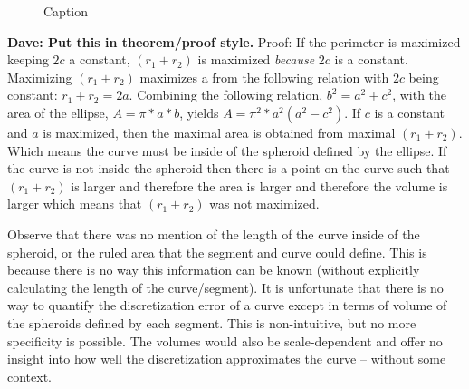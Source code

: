 \begin{figure}[h!]
  \caption{\label{EllipseGeometry} Caption}
\end{figure}

{\bf{Dave:  Put this in theorem/proof style.}}
Proof: If the perimeter is maximized keeping $2c$ a constant, $(r_1 + r_2)$ is maximized \textit{because} $2c$ is a constant.  Maximizing $(r_1+r_2)$ maximizes a from the following relation with $2c$ being constant: $r_1 + r_2 = 2a$.  Combining the following relation, $b^2 = a^2 + c^2$, with the area of the ellipse, $A = \pi * a * b$, yields $A=\pi^{2}*a^{2}(a^{2} - c^2)$.  If $c$ is a constant and $a$ is maximized, then the maximal area is obtained from maximal $(r_1+r_2)$.  Which means the curve must be inside of the spheroid defined by the ellipse.  If the curve is not inside the spheroid then there is a point on the curve such that $(r_1+r_2)$ is larger and therefore the area is larger and therefore the volume is larger which means that $(r_1+r_2)$ was not maximized.

Observe that there was no mention of the length of the curve inside of the spheroid, or the ruled area that the segment and curve could define.  This is because there is no way this information can be known (without explicitly calculating the length of the curve/segment).  It is unfortunate that there is no way to quantify the discretization error of a curve except in terms of volume of the spheroids defined by each segment.  This is non-intuitive, but no more specificity is possible.  The volumes would also be scale-dependent and offer no insight into how well the discretization approximates the curve -- without some context.
